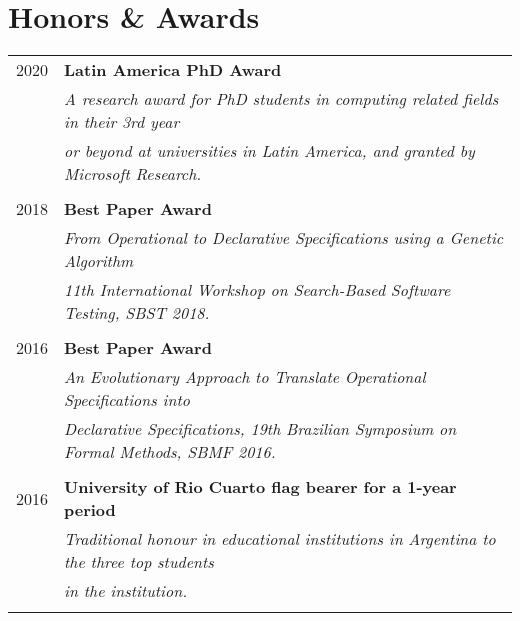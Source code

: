 \documentclass[a4paper,10pt]{article} %
\begin{document}
\section{Honors \& Awards}
\begin{longtable}{rl}

\textsc{2020} & \textbf{Latin America PhD Award} \\
& \textit{A research award for PhD students in computing related fields in their 3rd year} \\
& \textit{or beyond at universities in Latin America, and granted by Microsoft Research.} \\ & \\

\textsc{2018} & \textbf{Best Paper Award} \\ 
& \textit{From Operational to Declarative Specifications using a Genetic Algorithm} \\
& \textit{11th International Workshop on Search-Based Software Testing, SBST 2018.} \\ & \\

\textsc{2016} & \textbf{Best Paper Award} \\ 
& \textit{An Evolutionary Approach to Translate Operational Specifications into } \\
& \textit{Declarative Specifications, 19th Brazilian Symposium on Formal Methods, SBMF 2016.} \\ & \\

\textsc{2016} & \textbf{University of Rio Cuarto flag bearer for a 1-year period} \\ 
& \textit{Traditional honour in educational institutions in Argentina to the three top students} \\ 
& \textit{in the institution.} \\ & \\
\end{longtable}


\end{document}
